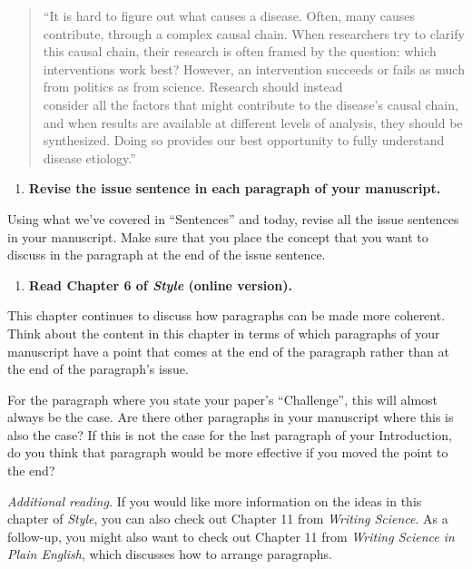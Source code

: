 \documentclass[]{tufte-book}
\providecommand{\tightlist}{%
  \setlength{\itemsep}{0pt}\setlength{\parskip}{0pt}}
\begin{document}
\begin{quote}
``It is hard to figure out what causes a disease. Often, many causes
contribute, through a complex causal chain. When researchers try to clarify
this causal chain, their research is often framed by the question: which
interventions work best? However, an intervention succeeds or fails
as much from politics as from science. Research should instead\\
consider all the factors that might contribute to the disease's causal
chain, and when results are available at different levels of analysis,
they should be synthesized. Doing so provides our best opportunity
to fully understand disease etiology.''
\end{quote}

\begin{enumerate}
\def\labelenumi{\arabic{enumi}.}
\setcounter{enumi}{7}
\tightlist
\item
  \textbf{Revise the issue sentence in each paragraph of your manuscript.}
\end{enumerate}

Using what we've covered in ``Sentences'' and today, revise all the issue
sentences in your manuscript. Make sure that you place the concept that you want
to discuss in the paragraph at the end of the issue sentence.

\begin{enumerate}
\def\labelenumi{\arabic{enumi}.}
\setcounter{enumi}{8}
\tightlist
\item
  \textbf{Read Chapter 6 of \emph{Style} (online version).}
\end{enumerate}

This chapter continues to discuss how paragraphs can be made more coherent.
Think about the content in this chapter in terms of which paragraphs of your
manuscript have a point that comes at the end of the paragraph rather than
at the end of the paragraph's issue.

For the paragraph where you state your paper's ``Challenge'', this will almost
always be the case. Are there other paragraphs in your manuscript where this is
also the case? If this is not the case for the last paragraph of your
Introduction, do you think that paragraph would be more effective if you moved
the point to the end?

\emph{Additional reading.} If you would like more information on the ideas in this
chapter of \emph{Style}, you can also check out Chapter 11 from \emph{Writing Science}.
As a follow-up, you might also want to check out Chapter 11 from \emph{Writing Science
in Plain English}, which discusses how to arrange paragraphs.
\end{document}
